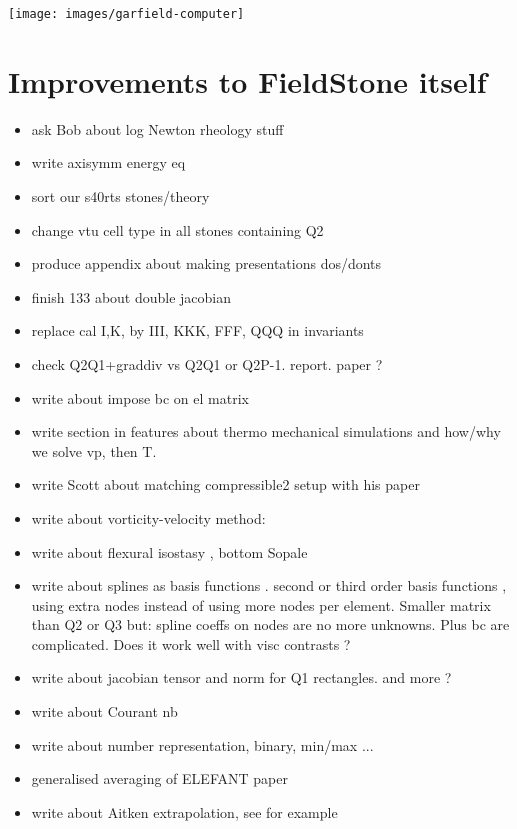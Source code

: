 \documentclass[a4paper]{article}
\begin{document}
\begin{center}
\texttt{[image: images/garfield-computer]}
\end{center}

\tableofcontents

\newpage
\section{Improvements to FieldStone itself}

\begin{itemize}
\item ask Bob about log Newton rheology stuff
\item write axisymm energy eq 
\item sort our s40rts stones/theory
\item change vtu cell type in all stones containing Q2
\item produce appendix about making presentations dos/donts 
\item finish 133 about double jacobian
\item replace cal I,K, by III, KKK, FFF, QQQ in invariants 
\item check Q2Q1+graddiv vs Q2Q1 or Q2P-1. report. paper ?
  \item write about impose bc on el matrix
  \item write section in features about thermo mechanical simulations and how/why we solve vp, then T.
  \item write Scott about matching compressible2 setup with his paper
  \item write about vorticity-velocity method: \cite{gats91,gust93,dehu95,ergq99,amct04,spez87}
  \item write about flexural isostasy \cite{maie12}, bottom Sopale
  \item write about splines as basis functions \cite{chri92}. second or third order basis functions , using extra nodes instead of using more nodes per element. 
  Smaller matrix than Q2 or Q3 but: spline coeffs on nodes are no more unknowns. Plus bc are complicated. Does it work well with visc contrasts ?
  \item write about jacobian tensor and norm for Q1 rectangles. and more ?
  \item write about Courant nb
  \item write about number representation, binary, min/max ... 
  \item generalised averaging of ELEFANT paper
  \item write about Aitken extrapolation, see for example \cite{jolm17}

\end{itemize}
\end{document}
